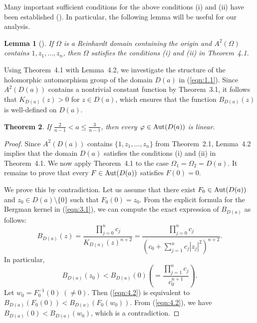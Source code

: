 \documentclass[12pt]{amsart}
\numberwithin{equation}{section}
\newtheorem{theorem}{Theorem}[section]
\newtheorem{lemma}[theorem]{Lemma}
\theoremstyle{definition}
\theoremstyle{remark}
\newcommand{\1}{{\bf 1}}
\begin{document}

Many important sufficient conditions for the 
above conditions (i) and (ii) 
have been established
(\cite{IsK10, Yam14, KNY14, Yam15, Yam17}).
In particular, 
the following lemma will be useful for our analysis.

\begin{lemma}[\cite{Yam17}]
If $\Omega$ is a Reinhardt domain 
containing the origin and 
$A^2(\Omega)$ contains $1, z_1, \ldots, z_n$, 
then $\Omega$ satisfies the conditions (i) and (ii) 
in Theorem~4.1. 
\end{lemma}


Using Theorem~4.1 with Lemma~4.2, 
we investigate the structure of 
the holomorphic automorphism group 
of the domain $D(a)$ in (\ref{eqn:1.1}). 
Since $A^2(D(a))$ contains a nontrivial
constant function by Theorem~3.1, 
it follows that  $K_{D(a)}(z)> 0$ for $z\in D(a)$, 
which ensures that the function 
$B_{D(a)}(z)$ is well-defined on $D(a)$. 




\begin{theorem}
If $\frac{2}{n-1}<a \leq \frac{3}{n-1}$, 
then every $\varphi\in{\rm Aut}(D(a))$ is linear. 
\end{theorem}


\begin{proof}
Since $A^2(D(a))$ contains $\{1,z_1,\ldots,z_n\}$ 
from Theorem~2.1, Lemma~4.2 implies that 
the domain $D(a)$ satisfies
the conditions (i) and (ii) in Theorem~4.1. 
We now apply Theorem~4.1 to the case
$\Omega_1=\Omega_2=D(a)$.
It remains to prove
that every $F\in{\rm Aut}(D(a))$
satisfies $F(0)=0$. 

We prove this by contradiction. 
Let us assume that there exist 
$F_0\in {\rm Aut}(D(a))$ and 
$z_0 \in D(a) \setminus\{0\}$ such that 
$F_0 (0)=z_0$. 
From the explicit formula for the Bergman kernel  
in (\ref{eqn:3.1}), 
we can compute the exact expression of 
$B_{D(a)}$ as follows:
\begin{equation}\label{eqn:4.3}
B_{D(a)}(z)=
\frac{\prod_{j=0}^n c_j}
{K_{D(a)}(z)^{n+2}}=
\frac{\prod_{j=0}^n c_j}
{(c_0+\sum_{j=1}^n c_j |z_j|^2)^{n+2}}. 
\end{equation}
In particular, 
\begin{equation}\label{eqn:4.4}
B_{D(a)}(z_0)<B_{D(a)}(0)
\left(=\frac{\prod_{j=1}^n c_j}{c_0^{n+1}}\right).
\end{equation}
Let $w_0=F_0^{-1}(0)\;(\neq 0)$.
Then (\ref{eqn:4.2}) is equivalent to 
$B_{D(a)}(F_0(0))<B_{D(a)}(F_0(w_0))$.
From (\ref{eqn:4.2}), we have
$B_{D(a)}(0)<B_{D(a)}(w_0)$,
which is a contradiction. 
\end{proof}
\end{document}
